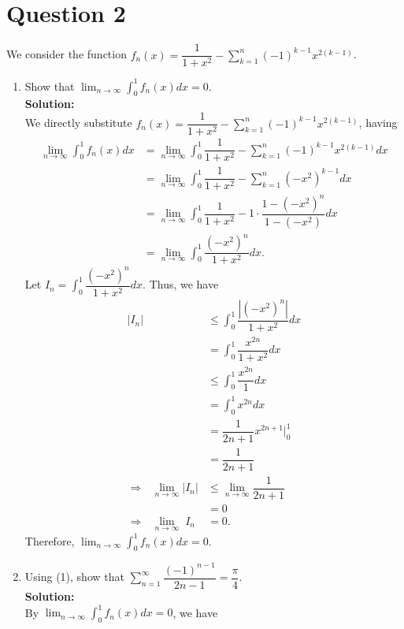 \documentclass{article}
\begin{document}
\section*{Question 2}
We consider the function $\displaystyle f_n(x)=\dfrac{1}{1+x^2}-\sum_{k=1}^n{(-1)^{k-1}x^{2(k-1)}}$.
\begin{enumerate}[(1)]
    \item Show that $\displaystyle\lim_{n\to\infty}{\int_0^1{f_n(x)dx}}=0$.\\
    \textbf{Solution:}\\
    We directly substitute $\displaystyle f_n(x)=\dfrac{1}{1+x^2}-\sum_{k=1}^n{(-1)^{k-1}x^{2(k-1)}}$, having
    \begin{align*}
        \lim_{n\to\infty}{\int_0^1{f_n(x)dx}}&=\lim_{n\to\infty}{\int_0^1{\dfrac{1}{1+x^2}-\sum_{k=1}^n{(-1)^{k-1}x^{2(k-1)}}dx}}\\
        &=\lim_{n\to\infty}{\int_0^1{\dfrac{1}{1+x^2}-\sum_{k=1}^n{(-x^2)^{k-1}}dx}}\\
        &=\lim_{n\to\infty}{\int_0^1{\dfrac{1}{1+x^2}-1\cdot\dfrac{1-(-x^2)^n}{1-(-x^2)}}dx}\\
        &=\lim_{n\to\infty}{\int_0^1{\dfrac{(-x^2)^n}{1+x^2}dx}}.
    \end{align*}
    Let $\displaystyle I_n=\int_0^1{\dfrac{(-x^2)^n}{1+x^2}dx}$. Thus, we have
    \begin{align*}
        |I_n|&\leq\int_0^1{\dfrac{|(-x^2)^n|}{1+x^2}dx}\\
        &=\int_0^1{\dfrac{x^{2n}}{1+x^2}dx}\\
        &\leq\int_0^1{\dfrac{x^{2n}}{1}dx}\\
        &=\int_0^1{x^{2n}dx}\\
        &=\dfrac{1}{2n+1}x^{2n+1}\Big|_0^1\\
        &=\dfrac{1}{2n+1}\\
        \Rightarrow\:\:\:\lim_{n\to\infty}{|I_n|}&\leq\lim_{n\to\infty}\dfrac{1}{2n+1}\\
        &=0\\
        \Rightarrow\:\:\:\lim_{n\to\infty}{\;I_n\;}&=0.
    \end{align*}
    Therefore, $\displaystyle\lim_{n\to\infty}{\int_0^1{f_n(x)dx}}=0$.
    \item Using (1), show that $\displaystyle\sum_{n=1}^\infty{\dfrac{(-1)^{n-1}}{2n-1}}=\dfrac{\pi}{4}$.\\
    \textbf{Solution:}\\
    By $\displaystyle\lim_{n\to\infty}{\int_0^1{f_n(x)dx}}=0$, we have

\end{enumerate}
\end{document}
